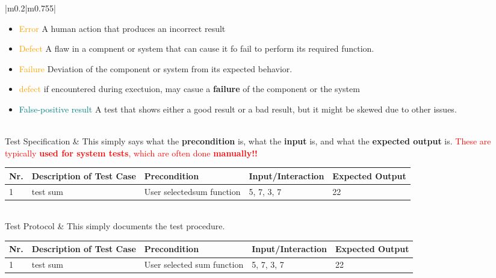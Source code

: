 \documentclass[main.tex,fontsize=8pt,paper=a4,paper=portrait,DIV=calc,]{scrartcl}
\begin{document}
\begin{table}[ht!]
\begin{tabular}{|m{0.2\linewidth}|m{0.755\linewidth}|}
\vspace{2mm}
\begin{itemize}
\item \textcolor{orange}{Error}\newline
  A human action that produces an incorrect result
\item \textcolor{orange}{Defect}\newline
  A flaw in a compnent or system that can cause it fo fail to perform its required function.
\item \textcolor{orange}{Failure}\newline
  Deviation of the component or system from its expected behavior.
\item \textcolor{orange}{defect}\newline
  if encountered during exectuion, may casue a \textbf{failure} of the component or the system
\item \textcolor{teal}{False-positive result}\newline
  A test that shows either a good result or a bad result, but it might be skewed due to other issues.
\vspace{-3mm}
\end{itemize} \\
\hline
Test Specification & 
This simply says what the \textbf{precondition} is, what the \textbf{input} is, and what the \textbf{expected output} is.\newline
\textcolor{red}{These are typically \textbf{used for system tests}, which are often done \textbf{manually!!}}\newline
\begin{tabular}{|l|l|l|l|l|}
\hline
Nr. & Description of Test Case & Precondition & Input/Interaction & Expected Output \\
\hline
1 & test sum & User selected\newline sum function & 5, 7, 3, 7 & 22 \\
\hline
\end{tabular}
\vspace{2mm}\\
\hline
Test Protocol & 
This simply documents the test procedure.\newline
\begin{tabular}{|l|l|l|l|l|}
\hline
Nr. & Description of Test Case & Precondition & Input/Interaction & Expected Output \\ 
\hline
1 & test sum & User selected sum function & 5, 7, 3, 7 & 22 \\
\hline
\end{tabular}

\end{tabular}
\end{table}
\end{document}

